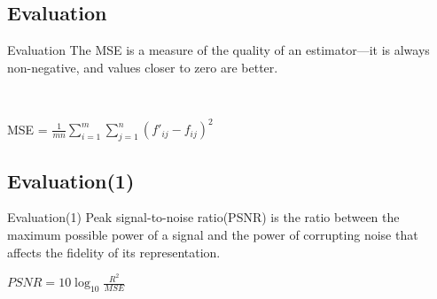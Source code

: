 \documentclass{beamer}
\begin{document}
	
	 
	
	
	
	







\subsection{Evaluation}
\begin{frame}{Evaluation}
The MSE is a measure of the quality of an estimator—it is always non-negative, and values closer to zero are better.


\

\begin{center}

	    MSE = $\frac{1}{mn}{\sum_{i=1}^{m}\sum_{j=1}^{n}(f'_{ij}-f_{ij})^2}$ 

\end{center}
 

\end{frame}

\subsection{Evaluation(1)}
\begin{frame}{Evaluation(1)}
Peak signal-to-noise ratio(PSNR) is the ratio between the maximum possible power of a signal and the power of corrupting noise that affects the fidelity of its representation. 

\vspace{1cm}

\begin{center}
	
	 $PSNR = 10 \log_{10}\frac{R^2}{MSE}$
	
\end{center}


\end{frame}
\end{document}
